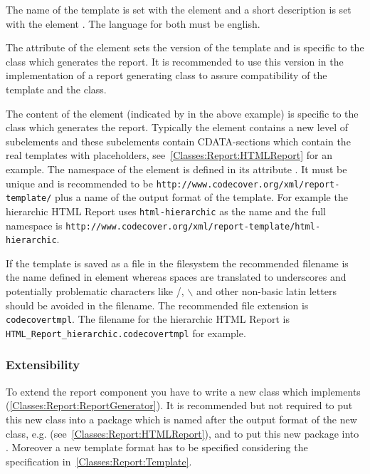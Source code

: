 The name of the template is set with the element  and a short description is set with the element . The language for both must be english.

The attribute  of the element  sets the version of the template and is specific to the class which generates the report. It is recommended to use this version in the implementation of a report generating class to assure compatibility of the template and the class.

The content of the element  (indicated by  in the above example) is specific to the class which generates the report. Typically the element  contains a new level of subelements and these subelements contain CDATA-sections which contain the real templates with placeholders, see~\ref{Classes:Report:HTMLReport} for an example. The namespace of the element  is defined in its attribute . It must be unique and is recommended to be \texttt{http://www.codecover.org/xml/report-template/} plus a name of the output format of the template. For example the hierarchic HTML Report uses \texttt{html-hierarchic} as the name and the full namespace is \texttt{http://www.codecover.org/xml/report-template/html-hierarchic}.

If the template is saved as a file in the filesystem the recommended filename is the name defined in element  whereas spaces are translated to underscores and potentially problematic characters like /, $\backslash$ and other non-basic latin letters should be avoided in the filename. The recommended file extension is \texttt{codecovertmpl}. The filename for the hierarchic HTML Report is \texttt{HTML\_Report\_hierarchic.codecovertmpl} for example.


\subsubsection{Extensibility}

To extend the report component you have to write a new class which implements  (\ref{Classes:Report:ReportGenerator}). It is recommended but not required to put this new class into a package which is named after the output format of the new class, e.g.  (see~\ref{Classes:Report:HTMLReport}), and to put this new package into . Moreover a new template format has to be specified considering the specification in~\ref{Classes:Report:Template}.


